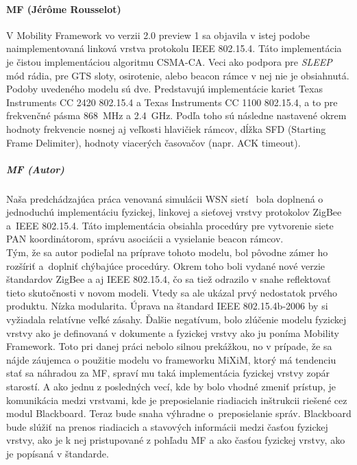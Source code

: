 \paragraph{MF (Jérôme Rousselot)}
\indent V Mobility Framework vo verzii 2.0 preview 1 sa objavila v istej podobe naimplementovaná linková vrstva protokolu IEEE 802.15.4. Táto implementácia je čistou implementáciou algoritmu CSMA-CA. Veci ako podpora pre \textit{SLEEP} mód rádia, pre GTS sloty, osirotenie, alebo beacon rámce v nej nie je obsiahnutá. Podoby uvedeného modelu sú dve. Predstavujú implementácie kariet Texas Instruments CC 2420 802.15.4 a Texas Instruments CC 1100 802.15.4, a to pre frekvenčné pásma 868~MHz a 2.4~GHz. Podľa toho sú následne nastavené okrem hodnoty frekvencie nosnej aj veľkosti hlavičiek rámcov, dĺžka SFD (Starting Frame Delimiter), hodnoty viacerých časovačov (napr. ACK timeout).
\subparagraph{MF (Autor)}
\indent Naša predchádzajúca práca venovaná simulácii WSN sietí~\cite{halas03} bola doplnená o jednoduchú implementáciu fyzickej, linkovej a sieťovej vrstvy protokolov ZigBee a~IEEE 802.15.4. Táto implementácia obsiahla procedúry pre vytvorenie siete PAN koordinátorom, správu asociácii a vysielanie beacon rámcov.\\
\indent Tým, že sa autor podieľal na príprave tohoto modelu, bol pôvodne zámer ho rozšíriť a~doplniť chýbajúce procedúry. Okrem toho boli vydané nové verzie štandardov ZigBee a aj IEEE 802.15.4, čo sa tiež odrazilo v snahe reflektovať tieto skutočnosti v novom modeli. Vtedy sa ale ukázal prvý nedostatok prvého produktu. Nízka modularita. Úprava na štandard IEEE 802.15.4b-2006 by si vyžiadala relatívne veľké zásahy. Ďalšie negatívum, bolo zlúčenie modelu fyzickej vrstvy ako je definovaná v dokumente a fyzickej vrstvy ako ju poníma Mobility Framework. Toto pri danej práci nebolo silnou prekážkou, no v prípade, že sa nájde záujemca o použitie modelu vo frameworku MiXiM, ktorý má tendenciu stať sa náhradou za MF, spraví mu taká implementácia fyzickej vrstvy zopár starostí. A ako jednu z posledných vecí, kde by bolo vhodné zmeniť prístup, je komunikácia medzi vrstvami, kde je preposielanie riadiacich inštrukcii riešené cez modul \ttfamily Blackboard\rmfamily. Teraz bude snaha výhradne o~preposielanie správ. \ttfamily Blackboard \rmfamily bude slúžiť na prenos riadiacich a stavových informácii medzi časťou fyzickej vrstvy, ako je k nej pristupované z pohľadu MF a ako časťou fyzickej vrstvy, ako je popísaná v štandarde.

